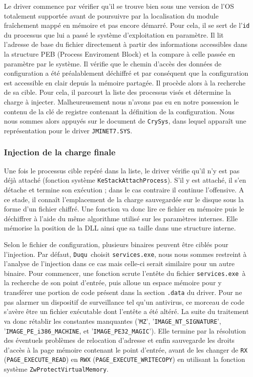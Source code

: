 \documentclass[times,11pt,fullpage]{article}
\newcommand{\Crysys}{\texttt{CrySys}}
\newcommand{\Duqu}{\texttt{Duqu}}
\newcommand{\jminet}{\texttt{JMINET7.SYS}}
\newcommand{\service}{\texttt{services.exe}}
\begin{document}
Le driver commence par vérifier qu'il se trouve bien sous une version de l'OS totalement supportée avant de poursuivre par la localisation du module fraîchement mappé en mémoire et pas encore démarré. Pour cela, il se sert de l'\texttt{id} du processus que lui a passé le système d'exploitation en paramètre. Il lit l'adresse de base du fichier directement à partir des informations accessibles dans la structure PEB (Process Enviroment Block) et la compare à celle passée en paramètre par le système. Il vérifie que le chemin d'accès des données de configuration a été préalablement déchiffré et par conséquent que la configuration est accessible en clair depuis la mémoire partagée. Il procède alors à la recherche de sa cible. Pour cela, il parcourt la liste des processus visés et détermine la charge à injecter. Malheureusement nous n'avons pas eu en notre possession le contenu de la clé de registre contenant la définition de la configuration. Nous nous sommes alors appuyés sur le document de \Crysys, dans 
lequel 
apparaît une représentation pour le driver \jminet.

\subsubsection{Injection de la charge finale}


Une fois le processus cible repéré dans la liste, le driver vérifie qu'il n'y est pas déjà attaché (fonction système \texttt{KeStackAttachProcess}). S'il y est attaché, il s'en détache et termine son exécution ; dans le cas contraire il continue l'offensive. A ce stade, il connaît l'emplacement de la charge sauvegardée sur le disque sous la forme d'un fichier chiffré. Une fonction va donc lire ce fichier en mémoire puis le déchiffrer à l'aide du même algorithme utilisé sur les paramètres internes. Elle mémorise la position de la DLL ainsi que sa taille dans une structure interne. 

Selon le fichier de configuration, plusieurs binaires peuvent être ciblés pour l'injection. Par défaut, \Duqu\ choisit \service, nous nous sommes restreint à l'analyse de l'injection dans ce cas mais celle-ci serait similaire pour un autre binaire.
Pour commencer, une fonction scrute l'entête du fichier \service\ à la recherche de son point d'entrée, puis alloue un espace mémoire pour y transférer une portion de code présent dans la section \texttt{.data} du driver. Pour ne pas alarmer un dispositif de surveillance tel qu'un antivirus, ce morceau de code s'avère être un fichier exécutable dont l'entête a été altéré. La suite du traitement va donc rétablir les constantes manquantes ('\texttt{MZ}', '\texttt{IMAGE\_NT\_SIGNATURE}', '\texttt{IMAGE\_PE\_i386\_MACHINE}, et '\texttt{IMAGE\_PE32\_MAGIC}'). Elle termine par la résolution des éventuels problèmes de relocation d'adresse et enfin sauvegarde les droits d'accès à la page mémoire contenant le point d'entrée, avant de les changer de \texttt{RX} (\texttt{PAGE\_EXECUTE\_READ}) en \texttt{RWX} (\texttt{PAGE\_EXECUTE\_WRITECOPY}) en utilisant la fonction système \texttt{ZwProtectVirtualMemory}.  
\end{document}
